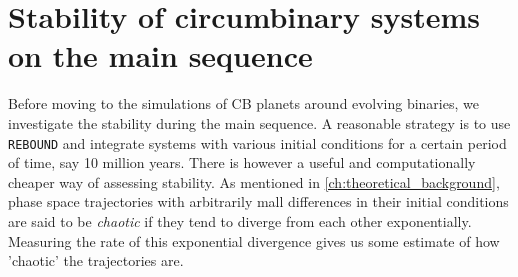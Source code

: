 \documentclass[ twoside,openright,titlepage,numbers=noenddot,headinclude,%
                footinclude=true,cleardoublepage=empty,abstractoff, %
                BCOR=5mm,paper=a4,fontsize=11pt,%
                american,%
                ]{scrreprt}
\begin{document}
\section{Stability of circumbinary systems on the main sequence}
\label{sec:Stability of observed circumbinary planets on the main sequence}
Before moving  to the simulations of CB planets around evolving
binaries, we investigate the stability during the main sequence. A reasonable
strategy is to use \texttt{REBOUND} and integrate systems with various initial
conditions for a certain period of time, say 10 million years. There is however
a useful and computationally cheaper way of assessing stability. As mentioned
in \cref{ch:theoretical_background}, phase space trajectories with arbitrarily 
mall differences in their initial conditions are said to be 
\emph{chaotic} if they tend to diverge 
from each other exponentially.  Measuring the rate of this exponential 
divergence gives us some estimate of how 'chaotic' the trajectories are.
\end{document}
